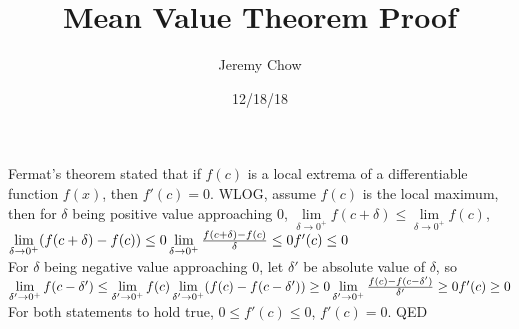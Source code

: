 \documentclass[12pt]{article}
\title{Mean Value Theorem Proof}
\author{Jeremy Chow}
\date{12/18/18}
\begin{document}
\maketitle
Fermat's theorem stated that if $f(c)$ is a local extrema of a differentiable function $f(x)$, then $f'(c)=0$. WLOG, assume $f(c)$ is the local maximum, then for $\delta$ being positive value approaching $0$, $\lim\limits_{\delta\to0^+}f(c+\delta)\leq\lim\limits_{\delta\to0^+}f(c)$, $\lim\limits_{\delta\to0^+}(f(c+\delta)-f(c))\leq0\\\lim\limits_{\delta\to0^+}\frac{f(c+\delta)-f(c)}{\delta}\leq0\\f'(c)\leq0$\\For $\delta$ being negative value approaching $0$, let $\delta'$ be absolute value of $\delta$, so $\lim\limits_{\delta'\to0^+}f(c-\delta')\leq\lim\limits_{\delta'\to0^+}f(c)\\\lim\limits_{\delta'\to0^+}(f(c)-f(c-\delta'))\geq0\\\lim\limits_{\delta'\to0^+}\frac{f(c)-f(c-\delta')}{\delta'}\geq0\\f'(c)\geq0$\\For both statements to hold true, $0\leq f'(c)\leq0$, $f'(c)=0$. QED
\end{document}
